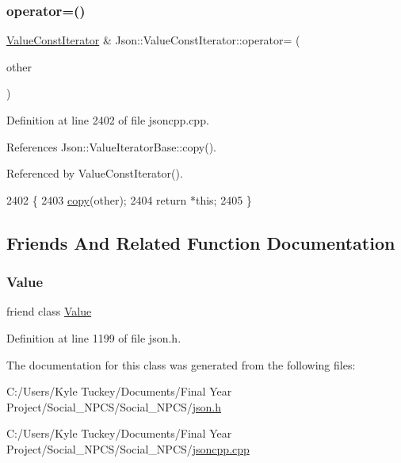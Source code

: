 \subsubsection{\texorpdfstring{operator=()}{operator=()}}
{\footnotesize\ttfamily \hyperlink{class_json_1_1_value_const_iterator}{Value\+Const\+Iterator} \& Json\+::\+Value\+Const\+Iterator\+::operator= (\begin{DoxyParamCaption}\item[{const \hyperlink{class_json_1_1_value_iterator_base}{Value\+Iterator\+Base} \&}]{other }\end{DoxyParamCaption})}



Definition at line 2402 of file jsoncpp.\+cpp.



References Json\+::\+Value\+Iterator\+Base\+::copy().



Referenced by Value\+Const\+Iterator().


\begin{DoxyCode}
2402                                           \{
2403   \hyperlink{class_json_1_1_value_iterator_base_a496e6aba44808433ec5858c178be5719}{copy}(other);
2404   \textcolor{keywordflow}{return} *\textcolor{keyword}{this};
2405 \}
\end{DoxyCode}


\subsection{Friends And Related Function Documentation}
\mbox{\label{class_json_1_1_value_const_iterator_aeceedf6e1a7d48a588516ce2b1983d6f}} 
\subsubsection{\texorpdfstring{Value}{Value}}
{\footnotesize\ttfamily friend class \hyperlink{class_json_1_1_value}{Value}\hspace{0.3cm}{\ttfamily [friend]}}



Definition at line 1199 of file json.\+h.



The documentation for this class was generated from the following files\+:\begin{DoxyCompactItemize}
\item 
C\+:/\+Users/\+Kyle Tuckey/\+Documents/\+Final Year Project/\+Social\+\_\+\+N\+P\+C\+S/\+Social\+\_\+\+N\+P\+C\+S/\hyperlink{json_8h}{json.\+h}\item 
C\+:/\+Users/\+Kyle Tuckey/\+Documents/\+Final Year Project/\+Social\+\_\+\+N\+P\+C\+S/\+Social\+\_\+\+N\+P\+C\+S/\hyperlink{jsoncpp_8cpp}{jsoncpp.\+cpp}\end{DoxyCompactItemize}
